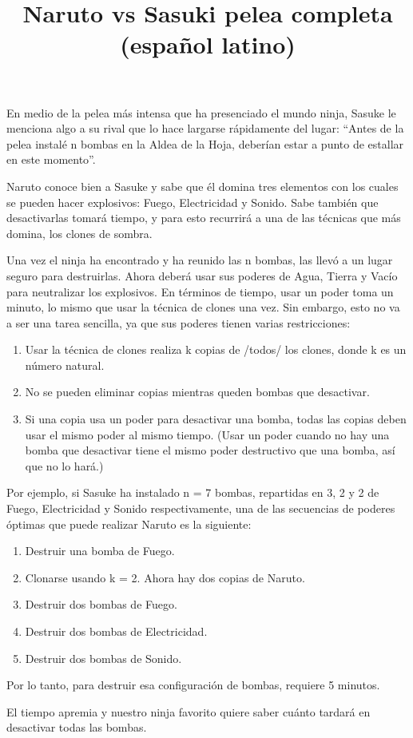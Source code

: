 \documentclass{oci}
\title{Naruto vs Sasuki pelea completa (español latino)}
\begin{document}
\begin{problemDescription}
En medio de la pelea más intensa que ha presenciado el mundo ninja, Sasuke le
menciona algo a su rival que lo hace largarse rápidamente del lugar: ``Antes de
la pelea instalé n bombas en la Aldea de la Hoja, deberían estar a punto de
estallar en este momento''.

Naruto conoce bien a Sasuke y sabe que él domina tres elementos con los cuales se pueden hacer explosivos: Fuego, Electricidad y Sonido. Sabe también que desactivarlas tomará tiempo, y para esto recurrirá a una de las técnicas que más domina, los clones de sombra.

Una vez el ninja ha encontrado y ha reunido las n bombas, las llevó a un lugar seguro para destruirlas. Ahora deberá usar sus poderes de Agua, Tierra y Vacío para neutralizar los explosivos. En términos de tiempo, usar un poder toma un minuto, lo mismo que usar la técnica de clones una vez. Sin embargo, esto no va a ser una tarea sencilla, ya que sus poderes tienen varias restricciones:

\begin{enumerate}
\item Usar la técnica de clones realiza k copias de /todos/ los clones, donde k es un número natural.
\item No se pueden eliminar copias mientras queden bombas que desactivar.
\item Si una copia usa un poder para desactivar una bomba, todas las copias deben usar el mismo poder al mismo tiempo. (Usar un poder cuando no hay una bomba que desactivar tiene el mismo poder destructivo que una bomba, así que no lo hará.)
\end{enumerate}

Por ejemplo, si Sasuke ha instalado n = 7 bombas, repartidas en 3, 2 y 2 de Fuego, Electricidad y Sonido respectivamente, una de las secuencias de poderes óptimas que puede realizar Naruto es la siguiente:

\begin{enumerate}
\item Destruir una bomba de Fuego.
\item Clonarse usando k = 2. Ahora hay dos copias de Naruto.
\item Destruir dos bombas de Fuego.
\item Destruir dos bombas de Electricidad.
\item Destruir dos bombas de Sonido.
\end{enumerate}

Por lo tanto, para destruir esa configuración de bombas, requiere 5 minutos.

El tiempo apremia y nuestro ninja favorito quiere saber cuánto tardará en desactivar todas las bombas.
\end{problemDescription}
\end{document}
